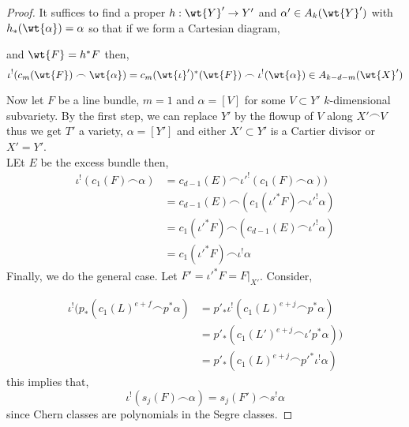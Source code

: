 \documentclass[12pt]{article}
\begin{document}
\begin{proof}
It suffices to find a proper $h : \wt{Y}' \to Y'$ and $\alpha' \in A_k(\wt{Y}')$ with $h_*(\wt{\alpha}) = \alpha$ so that if we form a Cartesian diagram,
\begin{center}
\end{center}
and $\wt{F} = h^* F$ then,
\[ \iota^!(c_m(\wt{F}) \frown \wt{\alpha}) = c_m(\wt{\iota}')^* (\wt{F}) \frown \iota^!(\wt{\alpha}) \in A_{k-d-m}(\wt{X}') \]



Now let $F$ be a line bundle, $m = 1$ and $\alpha = [V]$ for some $V \subset Y'$ $k$-dimensional subvariety. By the first step, we can replace $Y'$ by the flowup of $V$ along $X' \frown V$ thus we get $T'$ a variety, $\alpha = [Y']$ and either $X' \subset Y'$ is a Cartier divisor or $X' = Y'$.
\bigskip\\
LEt $E$ be the excess bundle then,
\begin{align*}
\iota^!(c_1(F) \frown \alpha) & = c_{d-1}(E) \frown \iota'^!(c_1(F) \frown \alpha)) 
\\
& = c_{d-1}(E) \frown (c_1(\iota'^* F) \frown \iota'^! \alpha)
\\
& = c_1(\iota'^* F) \frown (c_{d-1}(E) \frown \iota'^! \alpha)
\\
& = c_1(\iota'^* F) \frown \iota^! \alpha
\end{align*}
Finally, we do the general case. Let $F' = \iota'^* F = F|_{X'}$. Consider,
\begin{center}
\end{center}
\begin{align*}
\iota^! (p_* (c_1(L)^{e+f} \frown p^* \alpha) & = p'_* \iota^! (c_1(L)^{e+j} \frown p^* \alpha)
\\
& = p'_* (c_1(L')^{e+j} \frown \iota' p^* \alpha))
\\
& = p'_* (c_1(L)^{e+j} \frown p'^* \iota^! \alpha)
\end{align*}
this implies that,
\[ \iota^! (s_j(F) \frown \alpha) = s_j(F') \frown s^! \alpha \]
since Chern classes are polynomials in the Segre classes.
\end{proof}
\end{document}
